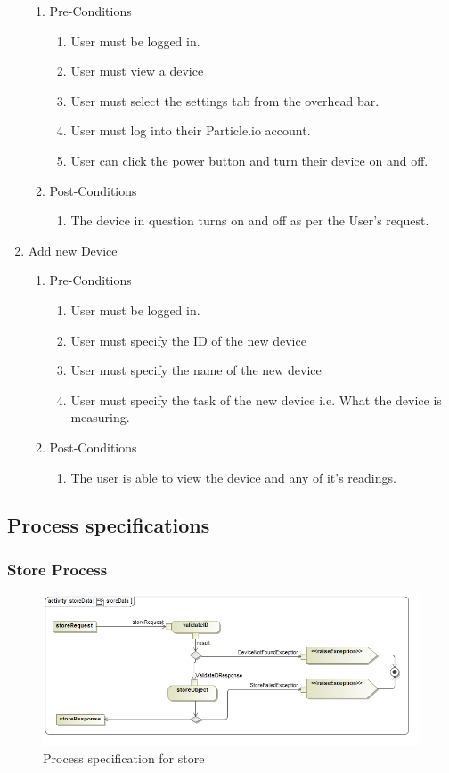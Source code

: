 \documentclass{article}
\begin{document}
\begin{enumerate}
		\begin{enumerate}
			\item  Pre-Conditions
			\begin{enumerate}
				\item	User must be logged in.
				\item	User must view a device
				\item	User must select the settings tab from the overhead bar.
				\item	User must log into their Particle.io account.
				\item	User can click the power button and turn their device on and off.
			\end{enumerate}
			\item  Post-Conditions		
			\begin{enumerate}
				\item	The device in question turns on and off as per the User's request.
			\end{enumerate}
		\end{enumerate}
		\item	Add new Device
		\begin{enumerate}
			\item  Pre-Conditions
			\begin{enumerate}
				\item	User must be logged in.
				\item	User must specify the ID of the new device
				\item	User must specify the name of the new device
				\item	User must specify the task of the new device i.e. What the device is measuring.
			\end{enumerate}
			\item  Post-Conditions		
			\begin{enumerate}
				\item	The user is able to view the device and any of it's readings.
			\end{enumerate}
		\end{enumerate}
	\end{enumerate}
	\newpage
	\subsection{Process specifications}
	\subsubsection{Store Process}
	\begin{figure}[H]
		\includegraphics[width=\textwidth]{images/storeData.jpg}
		\caption{Process specification for store \label{overflow}}
	\end{figure}
\end{document}
